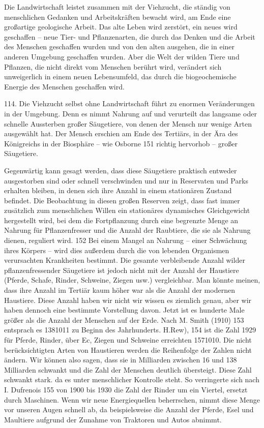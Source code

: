 \documentclass[11pt,a4paper]{book}
\begin{document}
Die Landwirtschaft leistet zusammen mit der Viehzucht, die ständig von menschlichen Gedanken und Arbeitskräften bewacht wird, am Ende eine großartige geologische Arbeit. Das alte Leben wird zerstört, ein neues wird geschaffen -- neue Tier- und Pflanzenarten, die durch das Denken und die Arbeit des Menschen geschaffen wurden und von den alten ausgehen, die in einer anderen Umgebung geschaffen wurden. Aber die Welt der wilden Tiere und Pflanzen, die nicht direkt vom Menschen berührt wird, verändert sich unweigerlich in einem neuen Lebensumfeld, das durch die biogeochemische Energie des Menschen geschaffen wird.



114. Die Viehzucht selbst ohne Landwirtschaft führt zu enormen Veränderungen in der Umgebung. Denn es nimmt Nahrung auf und verurteilt das langsame oder schnelle Aussterben großer Säugetiere, von denen der Mensch nur wenige Arten ausgewählt hat. Der Mensch erschien am Ende des Tertiärs, in der Ära des Königreichs in der Biosphäre -- wie Osborne 151 richtig hervorhob -- großer Säugetiere.



Gegenwärtig kann gesagt werden, dass diese Säugetiere praktisch entweder ausgestorben sind oder schnell verschwinden und nur in Reservaten und Parks erhalten bleiben, in denen sich ihre Anzahl in einem stationären Zustand befindet. Die Beobachtung in diesen großen Reserven zeigt, dass fast immer zusätzlich zum menschlichen Willen ein stationäres dynamisches Gleichgewicht hergestellt wird, bei dem die Fortpflanzung durch eine begrenzte Menge an Nahrung für Pflanzenfresser und die Anzahl der Raubtiere, die sie als Nahrung dienen, reguliert wird. 152 Bei einem Mangel an Nahrung -- einer Schwächung ihres Körpers -- wird dies außerdem durch die von lebenden Organismen verursachten Krankheiten bestimmt. Die gesamte verbleibende Anzahl wilder pflanzenfressender Säugetiere ist jedoch nicht mit der Anzahl der Haustiere (Pferde, Schafe, Rinder, Schweine, Ziegen usw.) vergleichbar. Man könnte meinen, dass ihre Anzahl im Tertiär kaum höher war als die Anzahl der modernen Haustiere. Diese Anzahl haben wir nicht wir wissen es ziemlich genau, aber wir haben dennoch eine bestimmte Vorstellung davon. Jetzt ist es hunderte Male größer als die Anzahl der Menschen auf der Erde. Nach M. Smith (1910) 153 entsprach es 1381011 zu Beginn des Jahrhunderts. H.Rew), 154 ist die Zahl 1929 für Pferde, Rinder, über Ec, Ziegen und Schweine erreichten 1571010. Die nicht berücksichtigten Arten von Haustieren werden die Reihenfolge der Zahlen nicht ändern. Wir können also sagen, dass sie in Milliarden zwischen 16 und 138 Milliarden schwankt und die Zahl der Menschen deutlich übersteigt. Diese Zahl schwankt stark. da es unter menschlicher Kontrolle steht. So verringerte sich nach I. Dufrenois 155 von 1900 bis 1930 die Zahl der Rinder um ein Viertel, ersetzt durch Maschinen. Wenn wir neue Energiequellen beherrschen, nimmt diese Menge vor unseren Augen schnell ab, da beispielsweise die Anzahl der Pferde, Esel und Maultiere aufgrund der Zunahme von Traktoren und Autos abnimmt.
\end{document}
